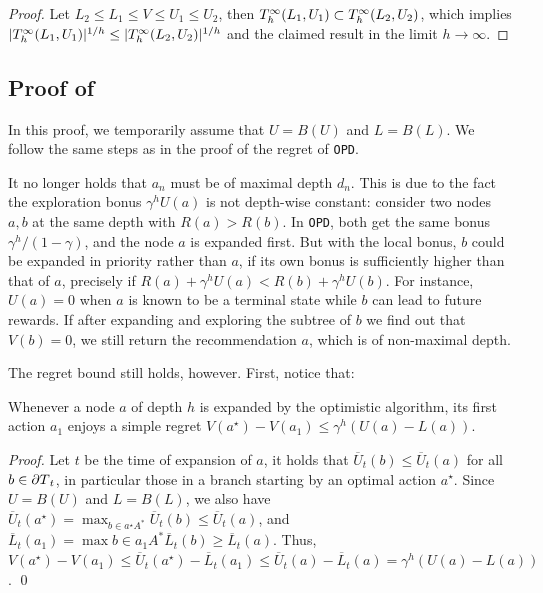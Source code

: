 \documentclass[runningheads]{llncs}
\begin{document}
\begin{proof}
Let $L_2\leq L_1\leq V\leq U_1\leq U_2$, then $T_h^\infty(L_1,U_1) \subset T_h^\infty(L_2,U_2)$, which implies $|T_h^\infty(L_1,U_1)|^{1/h} \leq |T_h^\infty(L_2,U_2)|^{1/h}$ and the claimed result in the limit $h\rightarrow\infty$.
\end{proof}

\subsection{Proof of }
In this proof, we temporarily assume that $U=B(U)$ and $L=B(L)$. We follow the same steps as in the proof of the regret of \texttt{OPD}.

\begin{remark}
It no longer holds that $a_n$ must be of maximal depth $d_n$.  This is due to the fact the exploration bonus $\gamma^h U(a)$ is not depth-wise constant: consider two nodes $a,b$ at the same depth with $R(a) > R(b)$. In \texttt{OPD}, both get the same bonus $\gamma^h/(1-\gamma)$, and the node $a$ is expanded first. But with the local bonus, $b$ could be expanded in priority rather than $a$, if its own bonus is sufficiently higher than that of $a$, precisely if $R(a)+\gamma^h U(a) < R(b)+\gamma^h U(b)$. For instance, $U(a)=0$ when $a$ is known to be a terminal state while $b$ can lead to future rewards. If after expanding and exploring the subtree of $b$ we find out that $V(b) = 0$, we still return the recommendation $a$, which is of non-maximal depth.
\end{remark}

The regret bound still holds, however. First, notice that:
\begin{lemma}[Expansion]
\label{lem:expansion-bound-U}
Whenever a node $a$ of depth $h$ is expanded by the optimistic algorithm, its first action $a_1$ enjoys a simple regret $V(a^\star)-V(a_1) \leq \gamma^h(U(a)-L(a))$. 
\end{lemma}
\begin{proof}
Let $t$ be the time of expansion of $a$, it holds that $\overline{U}_t(b) \leq \overline{U}_t(a)$ for all $b\in {\partial T}_t$, in particular those in a branch starting by an optimal action $a^\star$. Since $U=B(U)$ and $L=B(L)$, we also have $\overline{U}_t(a^\star) = \max_{b\in a^\star A^*} \overline{U}_t(b) \leq \overline{U}_t(a)$, and $\overline{L}_t(a_1) = \max{b\in a_1 A^*} \overline{L}_t(b) \geq  \overline{L}_t(a)$. Thus, $V(a^\star)-V(a_1) \leq \overline{U}_t(a^\star) - \overline{L}_t(a_1) \leq \overline{U}_t(a) - \overline{L}_t(a) = \gamma^h(U(a)-L(a))$.
\qed\end{proof}
 
\end{document}
